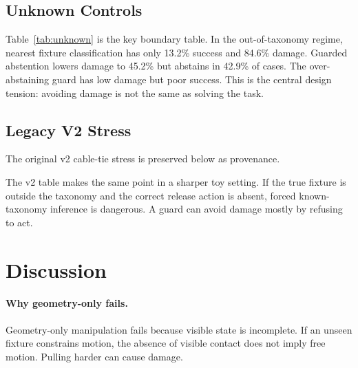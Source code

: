 \documentclass{article}
\begin{document}
\subsection{Unknown Controls}

\begin{table}[t]
\centering
\small
\caption{Unknown and boundary controls. Nearest known-taxonomy classification
is damaging under unknown fixtures and partial action menus. Guarding reduces
damage by abstaining; over-abstention is safe but unproductive.}
\label{tab:unknown}
\end{table}

Table~\ref{tab:unknown} is the key boundary table. In the out-of-taxonomy
regime, nearest fixture classification has only 13.2\% success and 84.6\%
damage. Guarded abstention lowers damage to 45.2\% but abstains in 42.9\% of
cases. The over-abstaining guard has low damage but poor success. This is the
central design tension: avoiding damage is not the same as solving the task.

\subsection{Legacy V2 Stress}

The original v2 cable-tie stress is preserved below as provenance.



The v2 table makes the same point in a sharper toy setting. If the true
fixture is outside the taxonomy and the correct release action is absent,
forced known-taxonomy inference is dangerous. A guard can avoid damage mostly
by refusing to act.

\section{Discussion}

\paragraph{Why geometry-only fails.}
Geometry-only manipulation fails because visible state is incomplete. If an
unseen fixture constrains motion, the absence of visible contact does not imply
free motion. Pulling harder can cause damage.
\end{document}
